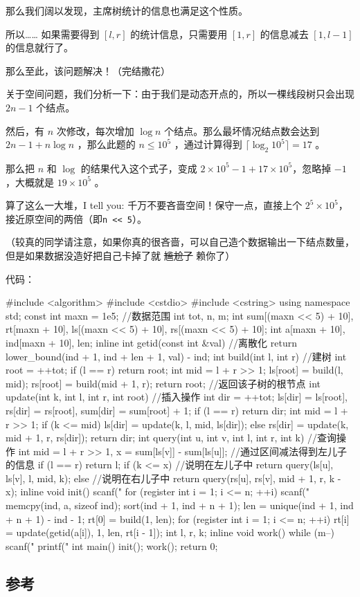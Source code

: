那么我们阔以发现，主席树统计的信息也满足这个性质。  

所以…… 如果需要得到 $[l,r]$ 的统计信息，只需要用 $[1,r]$ 的信息减去 $[1,l - 1]$ 的信息就行了。

那么至此，该问题解决！（完结撒花）

关于空间问题，我们分析一下：由于我们是动态开点的，所以一棵线段树只会出现 $2n-1$ 个结点。  

然后，有 $n$ 次修改，每次增加 $\log{n}$ 个结点。那么最坏情况结点数会达到 $2n-1+n\log{n}$ ，那么此题的 $n \leq 10^5$ ，通过计算得到 $\lceil\log_2{10^5}\rceil = 17$ 。  

那么把 $n$ 和 $\log$ 的结果代入这个式子，变成 $2\times 10^5-1+17\times 10^5$，忽略掉 $-1$ ，大概就是 $19\times 10^5$ 。

算了这么一大堆，I tell you: 千万不要吝啬空间！保守一点，直接上个 $2^5\times 10^5$，接近原空间的两倍（即\texttt{n << 5}）。  

（较真的同学请注意，如果你真的很吝啬，可以自己造个数据输出一下结点数量，但是如果数据没造好把自己卡掉了就 \st{尴尬了} 赖你了）

代码：

\begin{cppcode}
#include <algorithm>
#include <cstdio>
#include <cstring>
using namespace std;
const int maxn = 1e5;  //数据范围
int tot, n, m;
int sum[(maxn << 5) + 10], rt[maxn + 10], ls[(maxn << 5) + 10],
    rs[(maxn << 5) + 10];
int a[maxn + 10], ind[maxn + 10], len;
inline int getid(const int &val)  //离散化
{
  return lower_bound(ind + 1, ind + len + 1, val) - ind;
}
int build(int l, int r)  //建树
{
  int root = ++tot;
  if (l == r) return root;
  int mid = l + r >> 1;
  ls[root] = build(l, mid);
  rs[root] = build(mid + 1, r);
  return root;  //返回该子树的根节点
}
int update(int k, int l, int r, int root)  //插入操作
{
  int dir = ++tot;
  ls[dir] = ls[root], rs[dir] = rs[root], sum[dir] = sum[root] + 1;
  if (l == r) return dir;
  int mid = l + r >> 1;
  if (k <= mid)
    ls[dir] = update(k, l, mid, ls[dir]);
  else
    rs[dir] = update(k, mid + 1, r, rs[dir]);
  return dir;
}
int query(int u, int v, int l, int r, int k)  //查询操作
{
  int mid = l + r >> 1,
      x = sum[ls[v]] - sum[ls[u]];  //通过区间减法得到左儿子的信息
  if (l == r) return l;
  if (k <= x)  //说明在左儿子中
    return query(ls[u], ls[v], l, mid, k);
  else  //说明在右儿子中
    return query(rs[u], rs[v], mid + 1, r, k - x);
}
inline void init() {
  scanf("%
  for (register int i = 1; i <= n; ++i) scanf("%
  memcpy(ind, a, sizeof ind);
  sort(ind + 1, ind + n + 1);
  len = unique(ind + 1, ind + n + 1) - ind - 1;
  rt[0] = build(1, len);
  for (register int i = 1; i <= n; ++i)
    rt[i] = update(getid(a[i]), 1, len, rt[i - 1]);
}
int l, r, k;
inline void work() {
  while (m--) {
    scanf("%
    printf("%
  }
}
int main() {
  init();
  work();
  return 0;
}
\end{cppcode}

\subsection{参考}

\href{https://en.wikipedia.org/wiki/Persistent_data_structure}{}

\href{https://www.cnblogs.com/zinthos/p/3899565.html}{}

